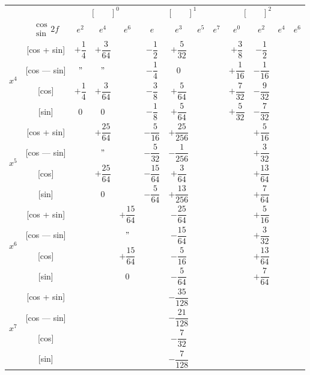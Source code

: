 \documentclass[11pt,a4paper]{book}
\begin{document}
\vspace{1em}


\begin{center}
\small
\begin{tabular}{|c|c|c|c|c|c|c|c|c|c|c|c|}
\hline
& &  &  &  \\
& $\begin{smallmatrix} \cos \\ \sin \end{smallmatrix} 2f$ & $e^2$ & $e^4$ & $e^6$ & $e$ & $e^3$ & $e^5$ & $e^7$ & $e^0$ & $e^2$ & $e^4$ & $e^6$ \\
\hline
{} & [cos + sin] & $+\dfrac{1}{4}$ & $+\dfrac{3}{64}$ & & $-\dfrac{1}{2}$ & $+\dfrac{5}{32}$ & & & $+\dfrac{3}{8}$ & $-\dfrac{1}{2}$ \\
& [cos --- sin] & $"$ & $"$ & & $-\dfrac{1}{4}$ & $0$ & & & $+\dfrac{1}{16}$ & $-\dfrac{1}{16}$ \\
& [cos] & $+\dfrac{1}{4}$ & $+\dfrac{3}{64}$ & & $-\dfrac{3}{8}$ & $+\dfrac{5}{64}$ & & & $+\dfrac{7}{32}$ & $-\dfrac{9}{32}$ \\
& [sin] & $0$ & $0$ & & $-\dfrac{1}{8}$ & $+\dfrac{5}{64}$ & & & $+\dfrac{5}{32}$ & $-\dfrac{7}{32}$ \\
\hline
{} & [cos + sin] & & $+\dfrac{25}{64}$ & & $-\dfrac{5}{16}$ & $+\dfrac{25}{256}$ & & & & $+\dfrac{5}{16}$ \\
& [cos --- sin] & & $"$ & & $-\dfrac{5}{32}$ & $-\dfrac{1}{256}$ & & & & $+\dfrac{3}{32}$ \\
& [cos] & & $+\dfrac{25}{64}$ & & $-\dfrac{15}{64}$ & $+\dfrac{3}{64}$ & & & & $+\dfrac{13}{64}$ \\
& [sin] & & $0$ & & $-\dfrac{5}{64}$ & $+\dfrac{13}{256}$ & & & & $+\dfrac{7}{64}$ \\
\hline
{} & [cos + sin] & & & $+\dfrac{15}{64}$ & & $-\dfrac{25}{64}$ & & & & $+\dfrac{5}{16}$ \\
& [cos --- sin] & & & $"$ & & $-\dfrac{15}{64}$ & & & & $+\dfrac{3}{32}$ \\
& [cos] & & & $+\dfrac{15}{64}$ & & $-\dfrac{5}{16}$ & & & & $+\dfrac{13}{64}$ \\
& [sin] & & & $0$ & & $-\dfrac{5}{64}$ & & & & $+\dfrac{7}{64}$ \\
\hline
{} & [cos + sin] & & & & & $-\dfrac{35}{128}$ & & & \\
& [cos --- sin] & & & & & $-\dfrac{21}{128}$ & & & \\
& [cos] & & & & & $-\dfrac{7}{32}$ & & & \\
& [sin] & & & & & $-\dfrac{7}{128}$ & & & \\
\hline
\end{tabular}
\end{center}
\end{document}
